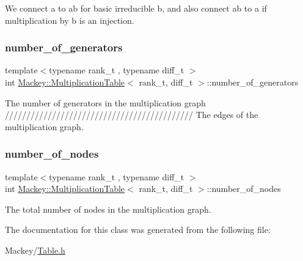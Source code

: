 We connect a to ab for basic irreducible b, and also connect ab to a if multiplication by b is an injection. 

\mbox{\label{classMackey_1_1MultiplicationTable_aa964329ee1c5b9072146567d2bd6567f}} 
\subsubsection{\texorpdfstring{number\+\_\+of\+\_\+generators}{number\_of\_generators}}
{\footnotesize\ttfamily template$<$typename rank\+\_\+t , typename diff\+\_\+t $>$ \\
int \hyperlink{classMackey_1_1MultiplicationTable}{Mackey\+::\+Multiplication\+Table}$<$ rank\+\_\+t, diff\+\_\+t $>$\+::number\+\_\+of\+\_\+generators\hspace{0.3cm}{\ttfamily [protected]}}



The number of generators in the multiplication graph //////////////////////////////////////////// The edges of the multiplication graph. 

\mbox{\label{classMackey_1_1MultiplicationTable_a224de8ffa6d10b7d9511880bb8a2260f}} 
\subsubsection{\texorpdfstring{number\+\_\+of\+\_\+nodes}{number\_of\_nodes}}
{\footnotesize\ttfamily template$<$typename rank\+\_\+t , typename diff\+\_\+t $>$ \\
int \hyperlink{classMackey_1_1MultiplicationTable}{Mackey\+::\+Multiplication\+Table}$<$ rank\+\_\+t, diff\+\_\+t $>$\+::number\+\_\+of\+\_\+nodes\hspace{0.3cm}{\ttfamily [protected]}}



The total number of nodes in the multiplication graph. 



The documentation for this class was generated from the following file\+:\begin{DoxyCompactItemize}
\item 
Mackey/\hyperlink{Table_8h}{Table.\+h}\end{DoxyCompactItemize}
